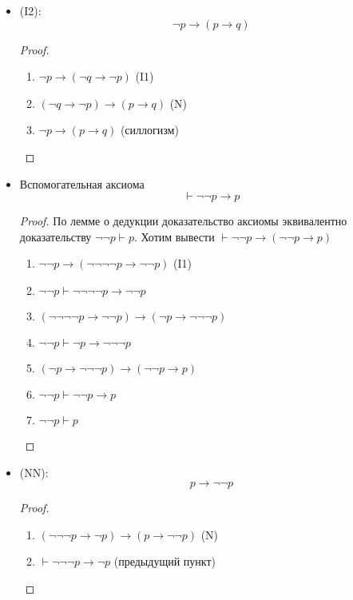 \documentclass[12pt]{article}
\let\im\rightarrow
\let\n\neg
\theoremstyle{definition}
\theoremstyle{statement}
\theoremstyle{theorem}
\begin{document}
\begin{itemize}
  \item (I2):
    \[
      \n p \im (p \im q)
    \]
    \begin{proof}
      \begin{enumerate}
        \item $\n p \im (\n q \im \n p)$ (I1)

        \item $(\n q \im \n p) \im (p \im q)$ (N)

        \item $\n p \im(p \im q)$ (силлогизм)
      \end{enumerate}
    \end{proof}

  \item Вспомогательная аксиома
    \[
      \vdash \n\n p \im p
    \]
    \begin{proof}
      По лемме о дедукции доказательство аксиомы эквивалентно
      доказательству $\n\n p \vdash p$. Хотим вывести $\vdash \n\n p
      \im (\n\n p \im p)$
      \begin{enumerate}
        \item $\n\n p \im (\n\n\n\n p \im \n\n p)$ (I1)

        \item $\n\n p \vdash \n\n\n\n p \im \n\n p$

        \item $(\n\n\n\n p \im \n\n p) \im (\n p \im \n\n\n p)$

        \item $\n\n p \vdash \n p \im \n\n\n p$

        \item $(\n p \im \n\n\n p) \im (\n\n p \im p)$

        \item $\n\n p \vdash \n\n p \im p$

        \item $\n\n p \vdash p$
      \end{enumerate}
    \end{proof}

  \item (NN):
    \[
      p \im \n\n p
    \]
    \begin{proof}
      \begin{enumerate}
        \item $(\n\n\n p \im \n p) \im (p \im \n\n p)$ (N)

        \item $\vdash \n\n\n p \im \n p$ (предыдущий пункт)


\end{enumerate}
\end{proof}
\end{itemize}
\end{document}
